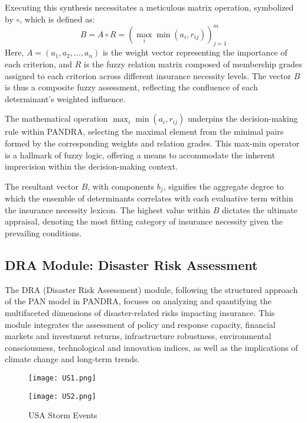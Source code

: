 \documentclass{mcmthesis}
\begin{document}
Executing this synthesis necessitates a meticulous matrix operation, symbolized by \( \circ \), which is defined as:
\begin{equation}
B = A \circ R = \left( \max_{i} \min(a_{i}, r_{ij}) \right)_{j=1}^{m}
\end{equation}
Here, \( A = (a_1, a_2, \ldots, a_n) \) is the weight vector representing the importance of each criterion, and \( R \) is the fuzzy relation matrix composed of membership grades assigned to each criterion across different insurance necessity levels. The vector \( B \) is thus a composite fuzzy assessment, reflecting the confluence of each determinant's weighted influence.

The mathematical operation \( \max_{i} \min(a_{i}, r_{ij}) \) underpins the decision-making rule within PANDRA, selecting the maximal element from the minimal pairs formed by the corresponding weights and relation grades. This max-min operator is a hallmark of fuzzy logic, offering a means to accommodate the inherent imprecision within the decision-making context.

The resultant vector \( B \), with components \( b_j \), signifies the aggregate degree to which the ensemble of determinants correlates with each evaluative term within the insurance necessity lexicon. The highest value within \( B \) dictates the ultimate appraisal, denoting the most fitting category of insurance necessity given the prevailing conditions.

\subsection{DRA Module: Disaster Risk Assessment}
The DRA (Disaster Risk Assessment) module, following the structured approach of the PAN model in PANDRA, focuses on analyzing and quantifying the multifaceted dimensions of disaster-related risks impacting insurance. This module integrates the assessment of policy and response capacity, financial markets and investment returns, infrastructure robustness, environmental consciousness, technological and innovation indices, as well as the implications of climate change and long-term trends.

  \begin{figure}[h]
    \centering
    \begin{minipage}{.5\textwidth}
        \centering
        \texttt{[image: US1.png]} %
        \label{fig:vermont}
    \end{minipage}%
    \begin{minipage}{.5\textwidth}
        \centering
        \texttt{[image: US2.png]} %
        \label{fig:texas}
    \end{minipage}
    \label{fig::USA-storm}
    \caption{USA Storm Events}
\end{figure}
\end{document}

